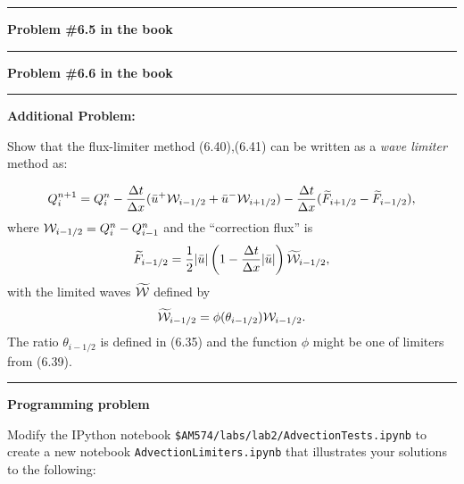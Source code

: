\documentclass[11pt]{article}
\begin{document}



\vskip 1cm
\hrule
{\bf Problem \#6.5 in the book}





\vskip 1cm
\hrule
{\bf Problem \#6.6 in the book}




\vskip 1cm
\hrule
{\bf Additional Problem:}

Show that the flux-limiter method (6.40),(6.41) can be written as a {\em
wave limiter} method as:

\[
Q_i^{n+1} = Q_i^n - \frac{\Delta t}{\Delta x} (\bar u^+ {\cal W}_{i-1/2}  + \bar u^- {\cal W}_{i+1/2})
-\frac{\Delta t}{\Delta x} (\widetilde F_{i+1/2} - \widetilde F_{i-1/2}),
\]
where ${\cal W}_{i-1/2} = Q_i^n - Q_{i-1}^n$ and the ``correction flux'' is
\[
\widetilde F_{i-1/2} = {\frac{1}{2}} |\bar u| 
\left(1 - \frac{\Delta t}{\Delta x} |\bar u|\right) \widetilde {{\cal W}}_{i-1/2},
\]
with the limited waves $\widetilde {{\cal W}}$ defined by
\[
\widetilde {{\cal W}}_{i-1/2} = \phi(\theta_{i-1/2}) {\cal W}_{i-1/2}.
\]
The ratio $\theta_{i-1/2}$ is defined in (6.35) and the
function $\phi$ might be one of limiters from (6.39).



\newpage

\vskip 1cm
\hrule
{\bf Programming problem}

Modify the IPython notebook \verb+$AM574/labs/lab2/AdvectionTests.ipynb+
to create a new notebook \verb+AdvectionLimiters.ipynb+ that illustrates
your solutions to the following:
\end{document}
